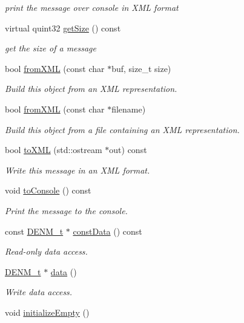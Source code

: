 \begin{DoxyCompactItemize}
\begin{DoxyCompactList}\small\item\em print the message over console in X\+ML format \end{DoxyCompactList}\item 
virtual quint32 \hyperlink{classDENMMessage_a6bb584a4ddb1f66f626e12d5928fe940}{get\+Size} () const 
\begin{DoxyCompactList}\small\item\em get the size of a message \end{DoxyCompactList}\item 
bool \hyperlink{classDENMMessage_ab061708d456f3921bfaabacf15287290}{from\+X\+ML} (const char $\ast$buf, size\+\_\+t size)
\begin{DoxyCompactList}\small\item\em Build this object from an X\+ML representation. \end{DoxyCompactList}\item 
bool \hyperlink{classDENMMessage_a7fae1c9283cf924804a68cdceb337554}{from\+X\+ML} (const char $\ast$filename)
\begin{DoxyCompactList}\small\item\em Build this object from a file containing an X\+ML representation. \end{DoxyCompactList}\item 
bool \hyperlink{classDENMMessage_a22e4f9e4a693f0164478b898cce64be0}{to\+X\+ML} (std\+::ostream $\ast$out) const 
\begin{DoxyCompactList}\small\item\em Write this message in an X\+ML format. \end{DoxyCompactList}\item 
void \hyperlink{classDENMMessage_a5ddb2e681944585e4704231818e96800}{to\+Console} () const \hypertarget{classDENMMessage_a5ddb2e681944585e4704231818e96800}{}\label{classDENMMessage_a5ddb2e681944585e4704231818e96800}

\begin{DoxyCompactList}\small\item\em Print the message to the console. \end{DoxyCompactList}\item 
const \hyperlink{structDENM}{D\+E\+N\+M\+\_\+t} $\ast$ \hyperlink{classDENMMessage_aafe380fd43ae1a6499e34ba1cf82f514}{const\+Data} () const 
\begin{DoxyCompactList}\small\item\em Read-\/only data access. \end{DoxyCompactList}\item 
\hyperlink{structDENM}{D\+E\+N\+M\+\_\+t} $\ast$ \hyperlink{classDENMMessage_a9f003727df70d0e5ad68afd43923390d}{data} ()
\begin{DoxyCompactList}\small\item\em Write data access. \end{DoxyCompactList}\item 
void \hyperlink{classDENMMessage_a0cbb36c1d20462b847debffcd5bb76df}{initialize\+Empty} ()\hypertarget{classDENMMessage_a0cbb36c1d20462b847debffcd5bb76df}{}\label{classDENMMessage_a0cbb36c1d20462b847debffcd5bb76df}


\end{DoxyCompactItemize}
